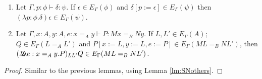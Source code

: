 \begin{lemma}
\label{lm:wte5}
$ $
\begin{enumerate}
\item
Let $\Gamma, p : \phi \vdash \delta : \psi$.  If $\epsilon \in E_\Gamma(\phi)$
and $\delta [p := \epsilon] \in E_\Gamma(\psi)$ then $(\lambda p:\phi.\delta) \epsilon \in E_\Gamma(\psi)$.
\item
Let $\Gamma, x : A, y : A, e : x =_A y \vdash P : M x =_B N y$.  If
$L, L' \in E_\Gamma(A)$; $Q \in E_\Gamma(L =_A L')$ and $P[ x := L, y := L, e
:= P ] \in E_\Gamma(M L =_B N L')$, then $(\lambda \!\! \lambda \!\! \lambda e : x =_A y . P)_{L L'} Q \in E_\Gamma(ML =_B NL')$.
\end{enumerate}
\end{lemma}

\begin{proof}
Similar to the previous lemmas, using Lemma \ref{lm:SNothers}.
\end{proof}

\begin{code}%
\>  \AgdaSymbol{:}  \AgdaSymbol{\{}\AgdaSymbol{\}} \AgdaSymbol{\{}\AgdaSymbol{\}} \AgdaSymbol{\{}\AgdaSymbol{\}} \AgdaSymbol{\{}\AgdaSymbol{\}} \AgdaSymbol{\{}\AgdaSymbol{\}} \AgdaSymbol{\{} \AgdaSymbol{:}   \AgdaSymbol{(} \AgdaSymbol{)\}} \<%
\\
\>[0]\<[18]%
\>[18]          \AgdaSymbol{(}\AgdaInductiveConstructor{\_,\_} \AgdaSymbol{\{} \AgdaSymbol{=} \AgdaSymbol{\}}  \AgdaSymbol{)}     \<%
\end{code}


